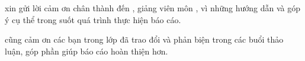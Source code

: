 
\Nhom{} xin gửi lời cảm ơn chân thành đến \GVHD{}, giảng viên môn \TenMon{},
vì những hướng dẫn và góp ý cụ thể trong suốt quá trình thực hiện báo cáo.

\noindent{}

\Nhom{} cũng cảm ơn các bạn trong lớp \MaLop{} đã trao đổi và phản biện trong các buổi
thảo luận, góp phần giúp báo cáo hoàn thiện hơn.
